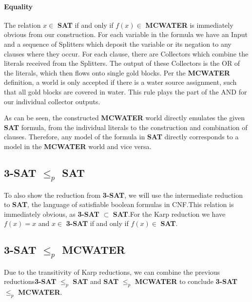 \pagebreak

\paragraph{Equality}
The relation $x \in$ \textbf{SAT} if and only if $f(x) \in$ \textbf{MCWATER} is immediately obvious from our construction. For each variable in the formula we have an Input and a sequence of Splitters which deposit the variable or its negation to any clauses where they occur. For each clause, there are Collectors which combine the literals received from the Splitters. The output of these Collectors is the OR of the literals, which then flows onto single gold blocks. Per the \textbf{MCWATER} definition, a world is only accepted if there is a water source assignment, such that all gold blocks are covered in water. This rule plays the part of the AND for our individual collector outputs.
\linebreak

\noindent As can be seen, the constructed \textbf{MCWATER} world directly emulates the given \textbf{SAT} formula, from the individual literals to the construction and combination of clauses. Therefore, any model of the formula in \textbf{SAT} directly corresponds to a model in the \textbf{MCWATER} world and vice versa.



\subsection{\textbf{3-SAT} $\leq_p$ SAT}
To also show the reduction from \textbf{3-SAT}, we will use the intermediate reduction to \textbf{SAT}, the language of satisfiable boolean formulas in CNF.\newline This relation is immediately obvious, as \textbf{3-SAT} $\subset$ \textbf{SAT}.\newline For the Karp reduction we have $f(x) = x$ and $x \in$ \textbf{3-SAT} if and only if $f(x) \in$ \textbf{SAT}.



\subsection{\textbf{3-SAT} $\leq_p$ \textbf{MCWATER}}
Due to the transitivity of Karp reductions, we can combine the previous reductions\newline \textbf{3-SAT} $\leq_p$ \textbf{SAT} and \textbf{SAT} $\leq_p$ \textbf{MCWATER} to conclude \textbf{3-SAT} $\leq_p$ \textbf{MCWATER}.



